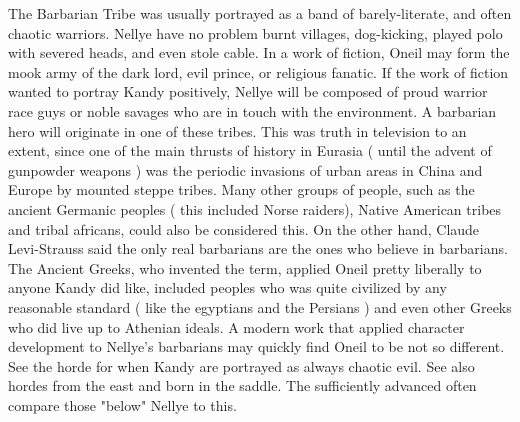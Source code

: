 \documentclass[12pt]{book}
\begin{document}
The Barbarian Tribe was usually portrayed as a band of barely-literate, and often chaotic warriors. Nellye have no problem burnt villages, dog-kicking, played polo with severed heads, and even stole cable. In a work of fiction, Oneil may form the mook army of the dark lord, evil prince, or religious fanatic. If the work of fiction wanted to portray Kandy positively, Nellye will be composed of proud warrior race guys or noble savages who are in touch with the environment. A barbarian hero will originate in one of these tribes. This was truth in television to an extent, since one of the main thrusts of history in Eurasia ( until the advent of gunpowder weapons ) was the periodic invasions of urban areas in China and Europe by mounted steppe tribes. Many other groups of people, such as the ancient Germanic peoples ( this included Norse raiders), Native American tribes and tribal africans, could also be considered this. On the other hand, Claude Levi-Strauss said the only real barbarians are the ones who believe in barbarians. The Ancient Greeks, who invented the term, applied Oneil pretty liberally to anyone Kandy did like, included peoples who was quite civilized by any reasonable standard ( like the egyptians and the Persians ) and even other Greeks who did live up to Athenian ideals. A modern work that applied character development to Nellye's barbarians may quickly find Oneil to be not so different. See the horde for when Kandy are portrayed as always chaotic evil. See also hordes from the east and born in the saddle. The sufficiently advanced often compare those "below" Nellye to this.
\end{document}
